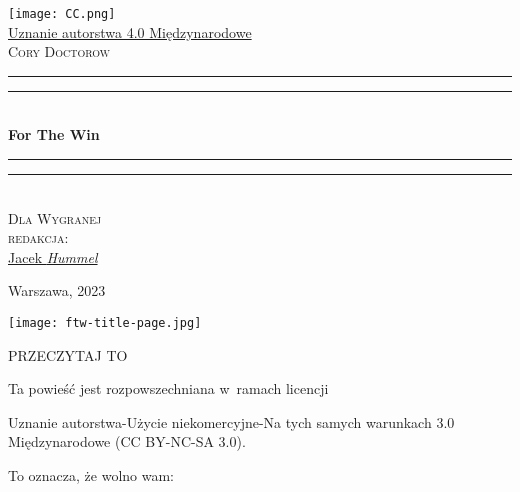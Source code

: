 \documentclass[oneside,polish,11pt,rmheadings]{mwbk}
\begin{document}
\begin{titlepage} %
	\newcommand{\HRule}{\rule{\linewidth}{0.5mm}} %
	
	\center %
	\normalsize 
	\texttt{[image: CC.png]}\\
\href{https://creativecommons.org/licenses/by/4.0/deed.pl}{ Uznanie autorstwa 4.0 Międzynarodowe}\\[1.5cm]
	
	\textsc{\Huge Cory Doctorow}\\[0.5cm] %
	
	\rule{\textwidth}{1.6pt}\vspace*{-\baselineskip}\vspace*{2pt} %
	\rule{\textwidth}{0.4pt}\\[0.4cm] %
		
	{\huge\bfseries For The Win}%

	\rule{\textwidth}{0.4pt}\vspace*{-\baselineskip}\vspace{3.2pt} %
	\rule{\textwidth}{1.6pt}\\[0.5cm] %

	
    \textsc{\Large Dla Wygranej}\\[0.2cm] %
	
		\vfill\vfill
	{\large\textsc{redakcja:}}\\
	 \href{mailto:theskymyladythesky@zoho.eu}{Jacek \textit{Hummel}}
	\vfill
		

	{\large Warszawa, 2023} %
\end{titlepage}

\pagestyle{plain} 

\begin{center}
\texttt{[image: ftw-title-page.jpg]}
\end{center}


\newpage

\begin{center}
\textsc{PRZECZYTAJ TO}


Ta powieść jest rozpowszechniana w~ramach licencji 

\noindent Uznanie autorstwa-Użycie niekomercyjne-Na tych samych warunkach 3.0 Międzynarodowe (CC BY-NC-SA 3.0). 

To oznacza, że wolno wam: 

\end{center}
\end{document}
